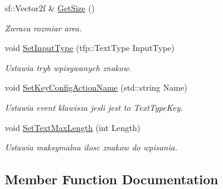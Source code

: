 \begin{DoxyCompactItemize}
\mbox{\label{classtfp_1_1_input_area_a99ca49b8d3e1546c6821bd00d41c5755}} 
sf\+::\+Vector2f \& \mbox{\hyperlink{classtfp_1_1_input_area_a99ca49b8d3e1546c6821bd00d41c5755}{Get\+Size}} ()
\begin{DoxyCompactList}\small\item\em Zwraca rozmiar area. \end{DoxyCompactList}\item 
\mbox{\label{classtfp_1_1_input_area_aa01c74edc35e67ec1bced098f11f6f69}} 
void \mbox{\hyperlink{classtfp_1_1_input_area_aa01c74edc35e67ec1bced098f11f6f69}{Set\+Input\+Type}} (tfp\+::\+Text\+Type Input\+Type)
\begin{DoxyCompactList}\small\item\em Ustawia tryb wpisywanych znakow. \end{DoxyCompactList}\item 
\mbox{\label{classtfp_1_1_input_area_a88d4061b723c7b1ee9a2d50f568828ff}} 
void \mbox{\hyperlink{classtfp_1_1_input_area_a88d4061b723c7b1ee9a2d50f568828ff}{Set\+Key\+Config\+Action\+Name}} (std\+::string Name)
\begin{DoxyCompactList}\small\item\em Ustawia event klawisza jesli jest to Text\+Type\+Key. \end{DoxyCompactList}\item 
\mbox{\label{classtfp_1_1_input_area_a4a689f25bbd5a836bdb597a59659320f}} 
void \mbox{\hyperlink{classtfp_1_1_input_area_a4a689f25bbd5a836bdb597a59659320f}{Set\+Text\+Max\+Length}} (int Length)
\begin{DoxyCompactList}\small\item\em Ustawia maksymalna ilosc znakow do wpisania. \end{DoxyCompactList}\end{DoxyCompactItemize}


\subsection{Member Function Documentation}
\mbox{\label{classtfp_1_1_input_area_ab37ba94e3de8df626cf8d48701921fe7}} 
